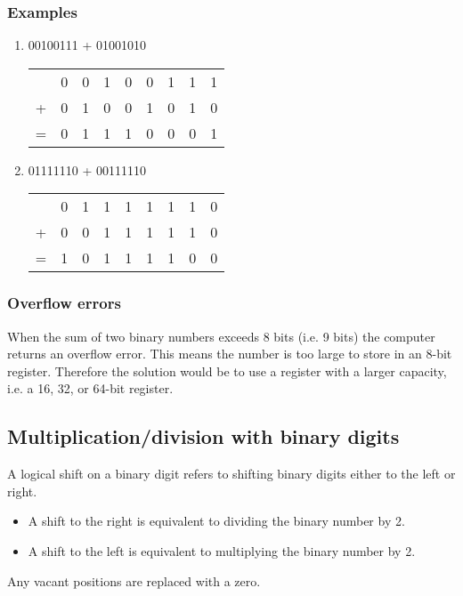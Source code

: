 \documentclass[11pt]{article}
\begin{document}
\subsubsection{Examples}
\label{sec:org2dbe38b}
\begin{enumerate}
\item 00100111 + 01001010
\begin{center}
\begin{tabular}{lrrrrrrrr}
 & 0 & 0 & 1 & 0 & 0 & 1 & 1 & 1\\
+ & 0 & 1 & 0 & 0 & 1 & 0 & 1 & 0\\
= & 0 & 1 & 1 & 1 & 0 & 0 & 0 & 1\\
\end{tabular}
\end{center}
\item 01111110 + 00111110
\begin{center}
\begin{tabular}{lrrrrrrrr}
 & 0 & 1 & 1 & 1 & 1 & 1 & 1 & 0\\
+ & 0 & 0 & 1 & 1 & 1 & 1 & 1 & 0\\
= & 1 & 0 & 1 & 1 & 1 & 1 & 0 & 0\\
\end{tabular}
\end{center}
\end{enumerate}
\subsubsection{Overflow errors}
\label{sec:org9c7464d}
When the sum of two binary numbers exceeds 8 bits (i.e. 9 bits) the computer returns an overflow error. This means the number is too large to store in an 8-bit register. Therefore the solution would be to use a register with a larger capacity, i.e. a 16, 32, or 64-bit register.
\subsection{Multiplication/division with binary digits}
\label{sec:org4146a7e}
A logical shift on a binary digit refers to shifting binary digits either to the left or right.
\begin{itemize}
\item A shift to the right is equivalent to dividing the binary number by 2.
\item A shift to the left is equivalent to multiplying the binary number by 2.
\end{itemize}
Any vacant positions are replaced with a zero.
\end{document}
